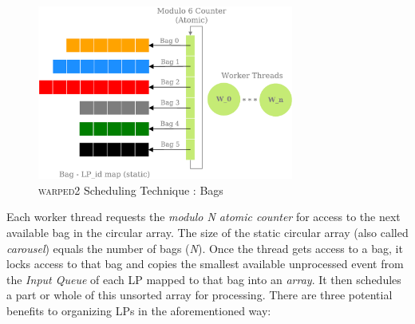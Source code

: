 \documentclass[11pt]{book}
\begin{document}
\begin{figure}
    \centering
    \includegraphics[width=0.75\textwidth]{figures/bags.pdf}
    \caption{\textsc{warped2} Scheduling Technique : Bags}\label{fig:bag_scheduling}
\end{figure}

Each worker thread requests the \emph{modulo N atomic counter} for access to the next available bag in the
circular array.  The size of the static circular array (also called \emph{carousel}) equals the number of bags
(\emph{N}).  Once the thread gets access to a bag, it locks access to that bag and copies the smallest
available unprocessed event from the \emph{Input Queue} of each LP mapped to that bag into an \emph{array}.
It then schedules a part or whole of this unsorted array for processing.  There are three potential benefits
to organizing LPs in the aforementioned way:
\end{document}
